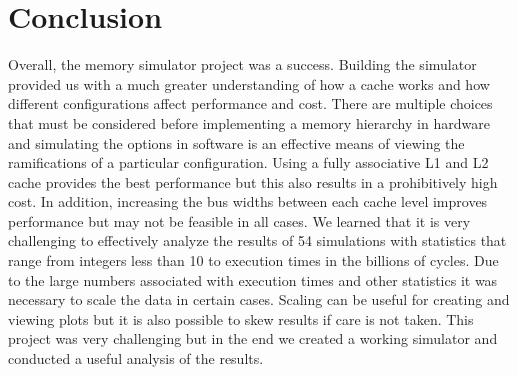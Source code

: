 \documentclass[11pt,titlepage]{article}
\begin{document}
\section{Conclusion}
Overall, the memory simulator project was a success. Building the simulator provided us with a much greater understanding of how a cache works and how different configurations affect performance and cost. There are multiple choices that must be considered before implementing a memory hierarchy in hardware and simulating the options in software is an effective means of viewing the ramifications of a particular configuration. Using a fully associative L1 and L2 cache provides the best performance but this also results in a prohibitively high cost. In addition, increasing the bus widths between each cache level improves performance but may not be feasible in all cases. We learned that it is very challenging to effectively analyze the results of 54 simulations with statistics that range from integers less than 10 to execution times in the billions of cycles.  Due to the large numbers associated with execution times and other statistics it was necessary to scale the data in certain cases. Scaling can be useful for creating and viewing plots but it is also possible to skew results if care is not taken. This project was very challenging but in the end we created a working simulator and conducted a useful analysis of the results.
\end{document}
